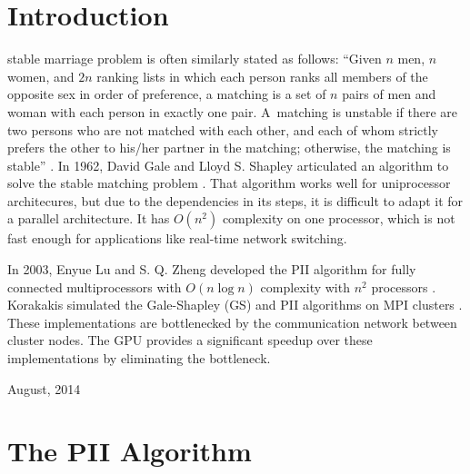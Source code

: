 \documentclass[journal]{IEEEtran}
\begin{document}
\section{Introduction}
% 
% 
% 
% 
 stable marriage problem is often similarly stated as
follows: ``Given $n$ men, $n$ women, and $2n$ ranking lists in which each
person ranks all members of the opposite sex in order of preference, a matching
is a set of $n$ pairs of men and woman with each person in exactly one pair.
A~matching is unstable if there are two persons who are not matched with each
other, and each of whom strictly prefers the other to his/her partner in the
matching; otherwise, the matching is stable'' \cite{lu-zheng}.  In 1962, David
Gale and Lloyd S. Shapley articulated an algorithm to solve the stable matching
problem \cite{gale-shapley}.  That algorithm works well for uniprocessor
architecures, but due to the dependencies in its steps, it is difficult to
adapt it for a parallel architecture.  It has $O(n^2)$ complexity on one
processor, which is not fast enough for applications like real-time network
switching.

In 2003, Enyue Lu and S. Q. Zheng developed the PII algorithm for fully
connected multiprocessors with $O(n \log n)$ complexity with $n^2$ processors
\cite{lu-zheng}.  Korakakis simulated the Gale-Shapley (GS) and PII algorithms
on MPI clusters \cite{korakakis}.  These implementations are bottlenecked by
the communication network between cluster nodes.  The GPU provides a
significant speedup over these implementations by eliminating the bottleneck.

\hfill August, 2014

\section{The PII Algorithm}
\end{document}

